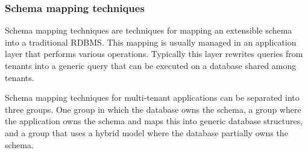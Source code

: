 \subsubsection{Schema mapping techniques}
Schema mapping techniques are techniques for mapping an extensible schema into a traditional \ac{RDBMS}.
This mapping is usually managed in an application layer that performs various operations. 
Typically this layer rewrites queries from tenants into a generic query that can be executed on a database shared among tenants.

Schema mapping techniques for multi-tenant applications can be separated into three groups. 
One group in which the database owns the schema, a group where the application owns the schema and maps this into generic database structures, and a group that uses a hybrid model where the database partially owns the schema.~\cite{aulbach2009comparison}

